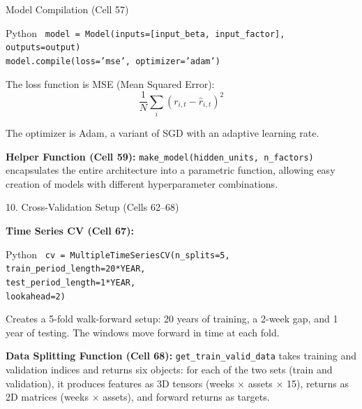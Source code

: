 \documentclass[aspectratio=169, 11pt]{beamer}
\begin{document}
\begin{frame}{Model Compilation (Cell 57)}

\begin{block}{Python}
\small
\texttt{
model = Model(inputs=[input\_beta, input\_factor], outputs=output) \\
model.compile(loss='mse', optimizer='adam')
}
\end{block}

\vspace{0.3cm}

The loss function is MSE (Mean Squared Error):
\[
\frac{1}{N} \sum_i (r_{i,t} - \hat{r}_{i,t})^2
\]

\vspace{0.3cm}

The optimizer is Adam, a variant of SGD with an adaptive learning rate.

\vspace{0.3cm}

\textbf{Helper Function (Cell 59):} \texttt{make\_model(hidden\_units, n\_factors)} encapsulates the entire architecture into a parametric function, allowing easy creation of models with different hyperparameter combinations.

\end{frame}
%
%
\begin{frame}{10. Cross-Validation Setup (Cells 62--68)}

\textbf{Time Series CV (Cell 67):}

\vspace{0.2cm}

\begin{block}{Python}
\small
\texttt{
cv = MultipleTimeSeriesCV(n\_splits=5, \\
\hspace{0.8cm} train\_period\_length=20*YEAR, \\
\hspace{0.8cm} test\_period\_length=1*YEAR, \\
\hspace{0.8cm} lookahead=2)
}
\end{block}

\vspace{0.3cm}

Creates a 5-fold walk-forward setup: 20 years of training, a 2-week gap, and 1 year of testing. The windows move forward in time at each fold.

\vspace{0.3cm}

\textbf{Data Splitting Function (Cell 68):} \texttt{get\_train\_valid\_data} takes training and validation indices and returns six objects: for each of the two sets (train and validation), it produces features as 3D tensors (weeks $\times$ assets $\times$ 15), returns as 2D matrices (weeks $\times$ assets), and forward returns as targets.

\end{frame}
\end{document}
